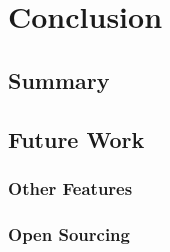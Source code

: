 \chapter{Conclusion}
\section{Summary}
\section{Future Work}
\subsection{Other Features}
\subsection{Open Sourcing}
